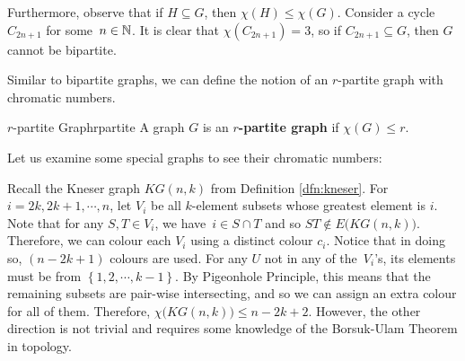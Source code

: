 \documentclass[math]{amznotes}
\makeatletter
\let\save@mathaccent\mathaccent
\newcommand*\if@single[3]{%
  \setbox0\hbox{${\mathaccent"0362{#1}}^H$}%
  \setbox2\hbox{${\mathaccent"0362{\kern0pt#1}}^H$}%
  \ifdim\ht0=\ht2 #3\else #2\fi
  }
\newcommand*\rel@kern[1]{\kern#1\dimexpr\macc@kerna}
\newcommand*\widebar[1]{\@ifnextchar^{{\wide@bar{#1}{0}}}{\wide@bar{#1}{1}}}
\newcommand*\wide@bar[2]{\if@single{#1}{\wide@bar@{#1}{#2}{1}}{\wide@bar@{#1}{#2}{2}}}
\newcommand*\wide@bar@[3]{%
  \begingroup
  \def\mathaccent##1##2{%
    \let\mathaccent\save@mathaccent
    \if#32 \let\macc@nucleus\first@char \fi
    \setbox\z@\hbox{$\macc@style{\macc@nucleus}_{}$}%
    \setbox\tw@\hbox{$\macc@style{\macc@nucleus}{}_{}$}%
    \dimen@\wd\tw@
    \advance\dimen@-\wd\z@
    \divide\dimen@ 3
    \@tempdima\wd\tw@
    \advance\@tempdima-\scriptspace
    \divide\@tempdima 10
    \advance\dimen@-\@tempdima
    \ifdim\dimen@>\z@ \dimen@0pt\fi
    \rel@kern{0.6}\kern-\dimen@
    \if#31
      \overline{\rel@kern{-0.6}\kern\dimen@\macc@nucleus\rel@kern{0.4}\kern\dimen@}%
      \advance\dimen@0.4\dimexpr\macc@kerna
      \let\final@kern#2%
      \ifdim\dimen@<\z@ \let\final@kern1\fi
      \if\final@kern1 \kern-\dimen@\fi
    \else
      \overline{\rel@kern{-0.6}\kern\dimen@#1}%
    \fi
  }%
  \macc@depth\@ne
  \let\math@bgroup\@empty \let\math@egroup\macc@set@skewchar
  \mathsurround\z@ \frozen@everymath{\mathgroup\macc@group\relax}%
  \macc@set@skewchar\relax
  \let\mathaccentV\macc@nested@a
  \if#31
    \macc@nested@a\relax111{#1}%
  \else
    \def\gobble@till@marker##1\endmarker{}%
    \futurelet\first@char\gobble@till@marker#1\endmarker
    \ifcat\noexpand\first@char A\else
      \def\first@char{}%
    \fi
    \macc@nested@a\relax111{\first@char}%
  \fi
  \endgroup
}
\theoremstyle{remark}
\newcommand{\0}{\mathbf{0}}
\newcommand{\1}{\mathbf{1}}
\makeatother
\begin{document}
Furthermore, observe that if $H \subseteq G$, then $\chi(H) \leq \chi(G)$. Consider a cycle $C_{2n + 1}$ for some~$n \in \mathbb{N}$. It is clear that $\chi(C_{2n + 1}) = 3$, so if $C_{2n + 1} \subseteq G$, then $G$ cannot be bipartite.

Similar to bipartite graphs, we can define the notion of an $r$-partite graph with chromatic numbers.
\begin{dfnbox}{$r$-partite Graph}{rpartite}
    A graph $G$ is an {\color{red} \textbf{$r$-partite graph}} if $\chi(G) \leq r$.
\end{dfnbox}
Let us examine some special graphs to see their chromatic numbers:
Recall the Kneser graph $KG(n, k)$ from Definition \ref{dfn:kneser}. For $i = 2k, 2k + 1, \cdots, n$, let $V_i$ be all $k$-element subsets whose greatest element is $i$. Note that for any $S, T \in V_i$, we have~$i \in S \cap T$ and so $ST \notin E\bigl(KG(n, k)\bigr)$. Therefore, we can colour each $V_i$ using a distinct colour $c_i$. Notice that in doing so, $(n - 2k + 1)$ colours are used. For any $U$ not in any of the~$V_i$'s, its elements must be from $\left\{1, 2, \cdots, k - 1\right\}$. By Pigeonhole Principle, this means that the remaining subsets are pair-wise intersecting, and so we can assign an extra colour for all of them. Therefore, $\chi\bigl(KG(n, k)\bigr) \leq n - 2k + 2$. However, the other direction is not trivial and requires some knowledge of the Borsuk-Ulam Theorem in topology.
\end{document}
